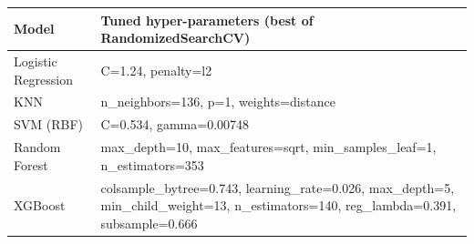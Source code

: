 \footnotesize
\begin{tabular}{p{}p{}}
\toprule
Model & Tuned hyper-parameters (best of RandomizedSearchCV) \\
\midrule
Logistic Regression & C=1.24, penalty=l2 \\
KNN & n\_neighbors=136, p=1, weights=distance \\
SVM (RBF) & C=0.534, gamma=0.00748 \\
Random Forest & max\_depth=10, max\_features=sqrt, min\_samples\_leaf=1, n\_estimators=353 \\
XGBoost & colsample\_bytree=0.743, learning\_rate=0.026, max\_depth=5, min\_child\_weight=13, n\_estimators=140, reg\_lambda=0.391, subsample=0.666 \\
\bottomrule
\end{tabular}
